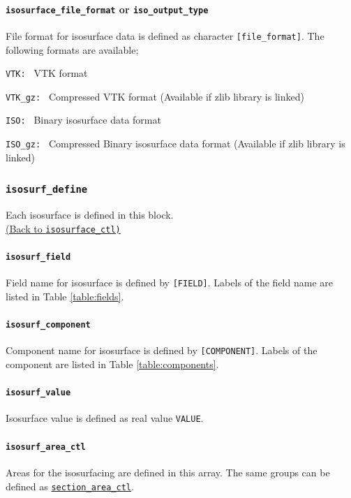 \paragraph{{\tt isosurface\_file\_format} or {\tt iso\_output\_type}}
\label{href_t:isosurface_file_format}
File format for isosurface data is defined as character \verb|[file_format]|. The following formats are available;
\begin{description}
\item{\tt VTK:     } VTK format
\item{\tt VTK\_gz: } Compressed VTK format (Available if zlib library is linked)
\item{\tt ISO:     } Binary isosurface data format
\item{\tt ISO\_gz: } Compressed Binary isosurface data format (Available if zlib library is linked)
\end{description}

\subsubsection{\tt isosurf\_define}
\label{href_t:isosurf_define}
Each isosurface is defined in this block. \\
\hyperref[href_i:isosurface_ctl]{(Back to {\tt isosurface\_ctl)}}

\paragraph{\tt isosurf\_field}
\label{href_t:isosurf_field}
Field name for isosurface is defined by \verb|[FIELD]|. Labels of the field name are listed in Table \ref{table:fields}. \\
%
\paragraph{\tt isosurf\_component}
\label{href_t:isosurf_component}
Component name for isosurface is defined by \verb|[COMPONENT]|. Labels of the component are listed in Table \ref{table:components}.

%
\paragraph{\tt isosurf\_value}
\label{href_t:isosurf_value}
Isosurface value is defined as real value \verb|VALUE|.

\paragraph{\tt isosurf\_area\_ctl}
\label{href_t:isosurf_area_ctl}
Areas for the isosurfacing are defined in this array. The same groups can be defined as \hyperref[href_t:psf_output_field]{\tt section\_area\_ctl}.

